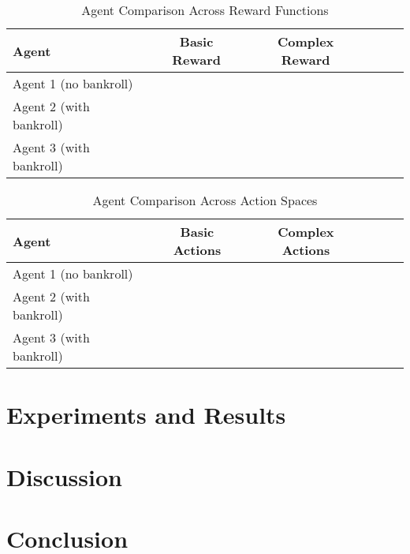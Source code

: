 \documentclass[sigconf]{acmart}
\newcommand{\cmark}{\ding{51}}  %
\begin{document}
\begin{table}[h]
  \caption{Agent Comparison Across Reward Functions}
  \label{tab:agent_benchmarks}
  \begin{tabular}{lccccc}
    \toprule
    \textbf{Agent} & \textbf{Basic Reward} & \textbf{Complex Reward} \\
    \midrule
    Agent 1 (no bankroll)  & \cmark  &        \\
    Agent 2 (with bankroll)   &         & \cmark \\
    Agent 3 (with bankroll)   &         & \cmark \\
    \bottomrule
  \end{tabular}
\end{table}

\begin{table}[h]
  \caption{Agent Comparison Across Action Spaces}
  \label{tab:agent_benchmarks}
  \begin{tabular}{lccccc}
    \toprule
    \textbf{Agent} & \textbf{Basic Actions} & \textbf{Complex Actions} \\
    \midrule
    Agent 1 (no bankroll)  & \cmark  &         \\
    Agent 2 (with bankroll)   & \cmark  &         \\
    Agent 3 (with bankroll)   &         & \cmark  \\
    \bottomrule
  \end{tabular}
\end{table}

\section{Experiments and Results}


\section{Discussion}
\section{Conclusion}




\end{document}
